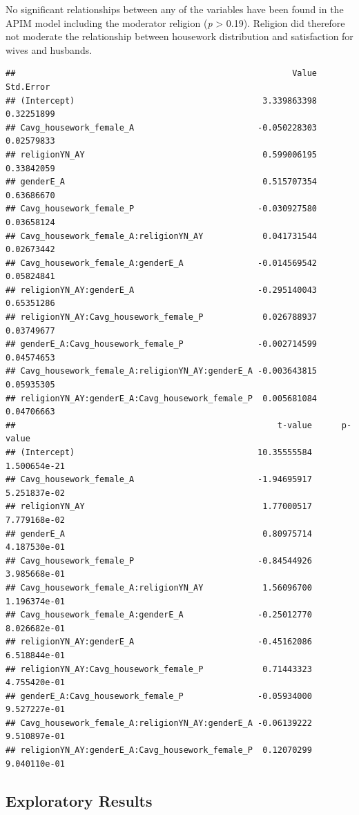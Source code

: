 \documentclass[
  man,floatsintext]{apa6}
\begin{document}
No significant relationships between any of the variables have been found in the APIM model including the moderator religion (\emph{p} \textgreater{} 0.19). Religion did therefore not moderate the relationship between housework distribution and satisfaction for wives and husbands.

\begin{verbatim}
##                                                        Value  Std.Error
## (Intercept)                                      3.339863398 0.32251899
## Cavg_housework_female_A                         -0.050228303 0.02579833
## religionYN_AY                                    0.599006195 0.33842059
## genderE_A                                        0.515707354 0.63686670
## Cavg_housework_female_P                         -0.030927580 0.03658124
## Cavg_housework_female_A:religionYN_AY            0.041731544 0.02673442
## Cavg_housework_female_A:genderE_A               -0.014569542 0.05824841
## religionYN_AY:genderE_A                         -0.295140043 0.65351286
## religionYN_AY:Cavg_housework_female_P            0.026788937 0.03749677
## genderE_A:Cavg_housework_female_P               -0.002714599 0.04574653
## Cavg_housework_female_A:religionYN_AY:genderE_A -0.003643815 0.05935305
## religionYN_AY:genderE_A:Cavg_housework_female_P  0.005681084 0.04706663
##                                                     t-value      p-value
## (Intercept)                                     10.35555584 1.500654e-21
## Cavg_housework_female_A                         -1.94695917 5.251837e-02
## religionYN_AY                                    1.77000517 7.779168e-02
## genderE_A                                        0.80975714 4.187530e-01
## Cavg_housework_female_P                         -0.84544926 3.985668e-01
## Cavg_housework_female_A:religionYN_AY            1.56096700 1.196374e-01
## Cavg_housework_female_A:genderE_A               -0.25012770 8.026682e-01
## religionYN_AY:genderE_A                         -0.45162086 6.518844e-01
## religionYN_AY:Cavg_housework_female_P            0.71443323 4.755420e-01
## genderE_A:Cavg_housework_female_P               -0.05934000 9.527227e-01
## Cavg_housework_female_A:religionYN_AY:genderE_A -0.06139222 9.510897e-01
## religionYN_AY:genderE_A:Cavg_housework_female_P  0.12070299 9.040110e-01
\end{verbatim}

\hypertarget{exploratory-results}{%
\subsection{Exploratory Results}\label{exploratory-results}}
\end{document}
